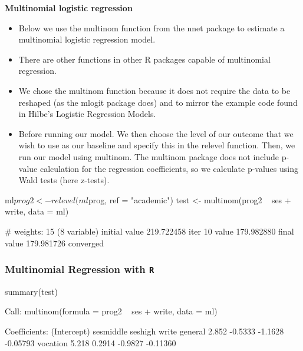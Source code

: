 \documentclass[00-GLMregslides.tex]{subfiles}
\begin{document}
	
\newpage
	
\Large
	


\begin{frame}[fragile]

\textbf{Multinomial logistic regression}
\begin{itemize}
\item 
Below we use the multinom function from the nnet package to estimate a multinomial logistic regression model. 
\item There are other functions in other R packages capable of multinomial regression. 
\item
  We chose the multinom function because it does not require the data to be reshaped (as the mlogit package does) and to mirror the example code found in Hilbe's Logistic Regression Models.
\item   
Before running our model. We then choose the level of our outcome that we wish to use as our baseline and specify this in the relevel function. Then, we run our model using multinom. The multinom package does not include p-value calculation for the regression coefficients, so we calculate p-values using Wald tests (here z-tests).
 
\end{itemize}
\end{frame}
\begin{frame}[fragile]

ml$prog2 <- relevel(ml$prog, ref = "academic")
test <- multinom(prog2 ~ ses + write, data = ml)
 
 # weights:  15 (8 variable)
 initial  value 219.722458 
 iter  10 value 179.982880
 final  value 179.981726 
 converged
\end{frame}
\begin{frame}[fragile]

\frametitle{Multinomial Regression with \texttt{R}}
\Large
summary(test)
 
 Call:
 multinom(formula = prog2 ~ ses + write, data = ml)
 
 Coefficients:
          (Intercept) sesmiddle seshigh    write
 general        2.852   -0.5333 -1.1628 -0.05793
 vocation       5.218    0.2914 -0.9827 -0.11360
\end{frame}
\end{document}
